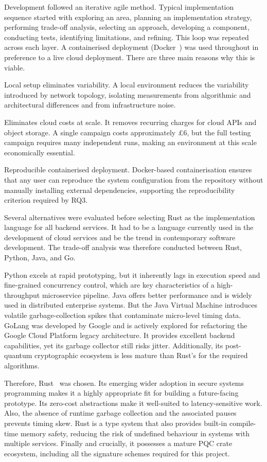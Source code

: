 \documentclass[12pt,a4paper]{article}
\begin{document}
Development followed an iterative agile method. Typical implementation sequence started with exploring an area, planning an implementation strategy, performing trade-off analysis, selecting an approach, developing a component, conducting tests, identifying limitations, and refining. This loop was repeated across each layer. A containerised deployment (Docker~\cite{merkel2014docker}) was used throughout in preference to a live cloud deployment. There are three main reasons why this is viable.

Local setup eliminates variability. A local environment reduces the variability introduced by network topology, isolating measurements from algorithmic and architectural differences and from infrastructure noise.

Eliminates cloud costs at scale. It removes recurring charges for cloud APIs and object storage. A single campaign costs approximately £6, but the full testing campaign requires many independent runs, making an environment at this scale economically essential.

Reproducible containerised deployment. Docker-based containerisation ensures that any user can reproduce the system configuration from the repository without manually installing external dependencies, supporting the reproducibility criterion required by RQ3.

Several alternatives were evaluated before selecting Rust as the implementation language for all backend services. It had to be a language currently used in the development of cloud services and be the trend in contemporary software development. The trade-off analysis was therefore conducted between Rust, Python, Java, and Go. 

Python excels at rapid prototyping, but it inherently lags in execution speed and fine-grained concurrency control, which are key characteristics of a high-throughput microservice pipeline. Java offers better performance and is widely used in distributed enterprise systems. But the Java Virtual Machine introduces volatile garbage-collection spikes that contaminate micro-level timing data. GoLang was developed by Google and is actively explored for refactoring the Google Cloud Platform legacy architecture. It provides excellent backend capabilities, yet its garbage collector still risks jitter. Additionally, its post-quantum cryptographic ecosystem is less mature than Rust's for the required algorithms. 

Therefore, Rust~\cite{matsakis2014rust} was chosen. Its emerging wider adoption in secure systems programming makes it a highly appropriate fit for building a future-facing prototype. Its zero-cost abstractions make it well-suited to latency-sensitive work. Also, the absence of runtime garbage collection and the associated pauses prevents timing skew. Rust is a type system that also provides built-in compile-time memory safety, reducing the risk of undefined behaviour in systems with multiple services. Finally and crucially, it possesses a mature PQC crate ecosystem, including all the signature schemes required for this project.
\end{document}
